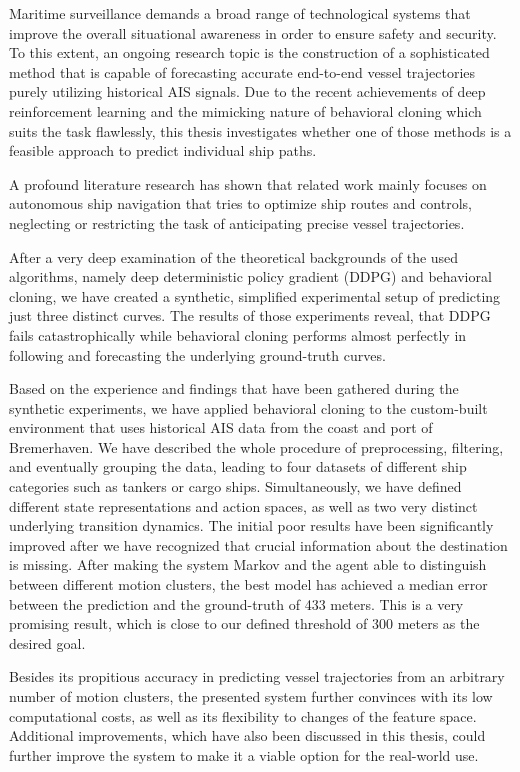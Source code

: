 Maritime surveillance demands a broad range of technological systems that improve the overall situational awareness in order to ensure safety and security. To this extent, an ongoing research topic is the construction of a sophisticated method that is capable of forecasting accurate end-to-end vessel trajectories purely utilizing historical AIS signals. Due to the recent achievements of deep reinforcement learning and the mimicking nature of behavioral cloning which suits the task flawlessly, this thesis investigates whether one of those methods is a feasible approach to predict individual ship paths.
\par
A profound literature research has shown that related work mainly focuses on autonomous ship navigation that tries to optimize ship routes and controls, neglecting or restricting the task of anticipating precise vessel trajectories. 
\par
After a very deep examination of the theoretical backgrounds of the used algorithms, namely deep deterministic policy gradient (DDPG) and behavioral cloning, we have created a synthetic, simplified experimental setup of predicting just three distinct curves. The results of those experiments reveal, that DDPG fails catastrophically while behavioral cloning performs almost perfectly in following and forecasting the underlying ground-truth curves. \par
Based on the experience and findings that have been gathered during the synthetic experiments, we have applied behavioral cloning to the custom-built environment that uses historical AIS data from the coast and port of Bremerhaven. We have described the whole procedure of preprocessing, filtering, and eventually grouping the data, leading to four datasets of different ship categories such as tankers or cargo ships. Simultaneously, we have defined different state representations and action spaces, as well as two very distinct underlying transition dynamics. The initial poor results have been significantly improved after we have recognized that crucial information about the destination is missing. After making the system Markov and the agent able to distinguish between different motion clusters, the best model has achieved a median error between the prediction and the ground-truth of 433 meters. This is a very promising result, which is close to our defined threshold of 300 meters as the desired goal.
\par
Besides its propitious accuracy in predicting vessel trajectories from an arbitrary number of motion clusters, the presented system further convinces with its low computational costs, as well as its flexibility to changes of the feature space. Additional improvements, which have also been discussed in this thesis, could further improve the system to make it a viable option for the real-world use.